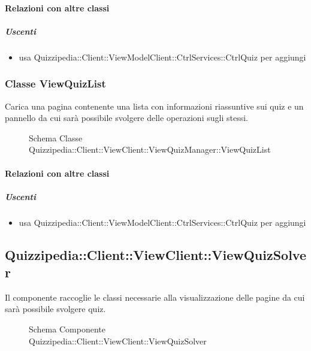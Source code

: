 \paragraph{Relazioni con altre classi}
\subparagraph{Uscenti}
\begin{itemize}
\item usa Quizzipedia::Client::ViewModelClient::CtrlServices::CtrlQuiz per aggiungi
\end{itemize}
\subsubsection{Classe ViewQuizList}
Carica una pagina contenente una lista con informazioni riassuntive sui quiz e un pannello da cui sarà possibile svolgere delle operazioni sugli stessi.
\begin{figure}[H]
\centering
\noindent{}
\caption[Schema Classe ViewQuizList]{Schema Classe Quizzipedia::Client::ViewClient::ViewQuizManager::ViewQuizList}
\end{figure}
\paragraph{Relazioni con altre classi}
\subparagraph{Uscenti}
\begin{itemize}
\item usa Quizzipedia::Client::ViewModelClient::CtrlServices::CtrlQuiz per aggiungi
\end{itemize}
\subsection{Quizzipedia::Client::ViewClient::ViewQuizSolver}
Il componente raccoglie le classi necessarie alla visualizzazione delle pagine da cui sarà possibile svolgere quiz.
\begin{figure}[H]
\centering
\noindent{}
\caption[Schema Componente Quizzipedia::Client::ViewClient::ViewQuizSolver]{Schema Componente Quizzipedia::Client::ViewClient::ViewQuizSolver}
\end{figure}
